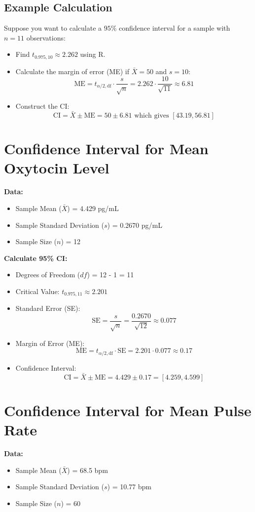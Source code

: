 \documentclass{article}
\begin{document}
\subsection{Example Calculation}
Suppose you want to calculate a \(95\%\) confidence interval for a sample with \(n = 11\) observations:
\begin{itemize}
    \item Find \(t_{0.975, 10} \approx 2.262\) using R.
    \item Calculate the margin of error (ME) if \(\bar{X} = 50\) and \(s = 10\):
    \[
    \text{ME} = t_{\alpha/2, \text{df}} \cdot \frac{s}{\sqrt{n}} = 2.262 \cdot \frac{10}{\sqrt{11}} \approx 6.81
    \]
    \item Construct the CI:
    \[
    \text{CI} = \bar{X} \pm \text{ME} = 50 \pm 6.81 \text{ which gives } [43.19, 56.81]
    \]
\end{itemize}

\section{Confidence Interval for Mean Oxytocin Level}
\textbf{Data:}
\begin{itemize}
    \item Sample Mean (\(\bar{X}\)) = 4.429 pg/mL
    \item Sample Standard Deviation (\(s\)) = 0.2670 pg/mL
    \item Sample Size (\(n\)) = 12
\end{itemize}

\textbf{Calculate 95\% CI:}
\begin{itemize}
    \item Degrees of Freedom (\(df\)) = 12 - 1 = 11
    \item Critical Value: \(t_{0.975, 11} \approx 2.201\)
    \item Standard Error (SE):
    \[
    \text{SE} = \frac{s}{\sqrt{n}} = \frac{0.2670}{\sqrt{12}} \approx 0.077
    \]
    \item Margin of Error (ME):
    \[
    \text{ME} = t_{\alpha/2, \text{df}} \cdot \text{SE} = 2.201 \cdot 0.077 \approx 0.17
    \]
    \item Confidence Interval:
    \[
    \text{CI} = \bar{X} \pm \text{ME} = 4.429 \pm 0.17 = [4.259, 4.599]
    \]
\end{itemize}

\section{Confidence Interval for Mean Pulse Rate}
\textbf{Data:}
\begin{itemize}
    \item Sample Mean (\(\bar{X}\)) = 68.5 bpm
    \item Sample Standard Deviation (\(s\)) = 10.77 bpm
    \item Sample Size (\(n\)) = 60
\end{itemize}
\end{document}
